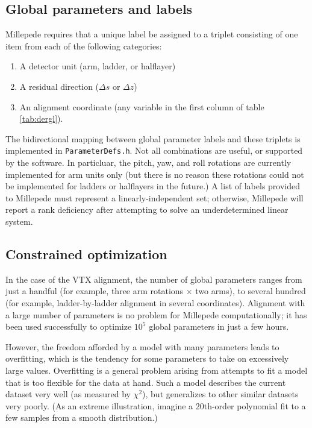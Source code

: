 \documentclass[12pt]{article}
\begin{document}
\subsection{Global parameters and labels} \label{sec:labels}
Millepede requires that a unique label be assigned to a triplet consisting of one item from each of the following categories:
\begin{enumerate}
  \item A detector unit (arm, ladder, or halflayer)
  \item A residual direction ($\Delta s$ or $\Delta z$)
  \item An alignment coordinate (any variable in the first column of table \ref{tab:dergl}).
\end{enumerate}
The bidirectional mapping between global parameter labels and these triplets is implemented in \texttt{ParameterDefs.h}. Not all combinations are useful, or supported by the software. In particluar, the pitch, yaw, and roll rotations are currently implemented for arm units only (but there is no reason these rotations could not be implemented for ladders or halflayers in the future.) A list of labels provided to Millepede must represent a linearly-independent set; otherwise, Millepede will report a rank deficiency after attempting to solve an underdetermined linear system. 


\subsection{Constrained optimization}
In the case of the VTX alignment, the number of global parameters ranges from just a handful (for example, three arm rotations $\times$ two arms), to several hundred (for example, ladder-by-ladder alignment in several coordinates). Alignment with a large number of parameters is no problem for Millepede computationally; it has been used successfully to optimize $10^5$ global parameters in just a few hours. 

However, the freedom afforded by a model with many parameters leads to overfitting, which is the tendency for some parameters to take on excessively large values. Overfitting is a general problem arising from attempts to fit a model that is too flexible for the data at hand. Such a model describes the current dataset very well (as measured by $\chi^2$), but generalizes to other similar datasets very poorly. (As an extreme illustration, imagine a 20th-order polynomial fit to a few samples from a smooth distribution.)
\end{document}
